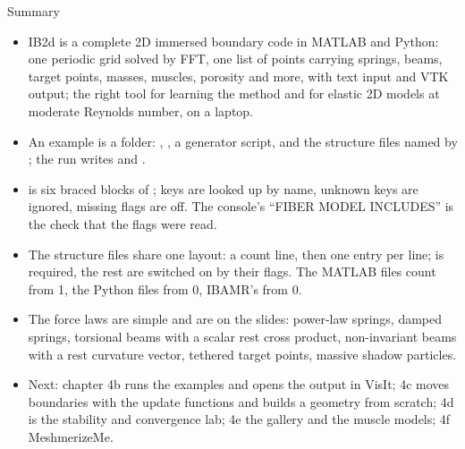\documentclass[aspectratio=169,11pt]{beamer}
\begin{document}
\begin{frame}{Summary}
\label{fr:summary}
\footnotesize
\begin{itemize}
  \item IB2d is a complete 2D immersed boundary code in MATLAB and Python: one periodic grid solved by FFT, one list of points carrying springs, beams, target points, masses, muscles, porosity and more, with text input and VTK output; the right tool for learning the method and for elastic 2D models at moderate Reynolds number, on a laptop.
  \item An example is a folder: , , a generator script, and the structure files named by ; the run writes  and .
  \item {} is six braced blocks of ; keys are looked up by name, unknown keys are ignored, missing flags are off. The console's ``FIBER MODEL INCLUDES'' is the check that the flags were read.
  \item The structure files share one layout: a count line, then one entry per line;  is required, the rest are switched on by their flags. The MATLAB files count from 1, the Python files from 0, IBAMR's from 0.
  \item The force laws are simple and are on the slides: power-law springs, damped springs, torsional beams with a scalar rest cross product, non-invariant beams with a rest curvature vector, tethered target points, massive shadow particles.
  \item Next: chapter 4b runs the examples and opens the output in VisIt; 4c moves boundaries with the update functions and builds a geometry from scratch; 4d is the stability and convergence lab; 4e the gallery and the muscle models; 4f MeshmerizeMe.
\end{itemize}
\end{frame}
\end{document}
